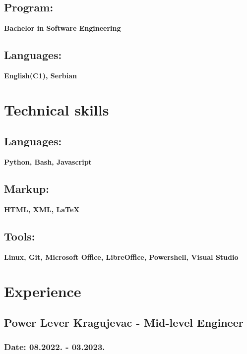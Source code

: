 \documentclass{article}
\begin{document}
	\subsection{\large{Program:}}
	\textbf{\large{Bachelor in Software Engineering}}
	\subsection{\large{Languages:}}
	\textbf{\large{English(C1), Serbian}}
	
	\section{\MakeUppercase{T}echnical skills}
	\subsection{\large{Languages:}}
	\textbf{\large{Python, Bash, Javascript}}
	\subsection{\large{Markup:}}
	\textbf{\large{HTML, XML, \LaTeX}}
	\subsection{\large{Tools:}}
	\textbf{\large{Linux, Git, Microsoft Office, LibreOffice, Powershell, Visual Studio}}
	
	\section{\MakeUppercase{E}xperience}
	\subsection{\large{Power Lever Kragujevac - Mid-level Engineer}}
	\subsubsection{\large{Date:}\normalsize{ 08.2022. - 03.2023.}}
\end{document}
